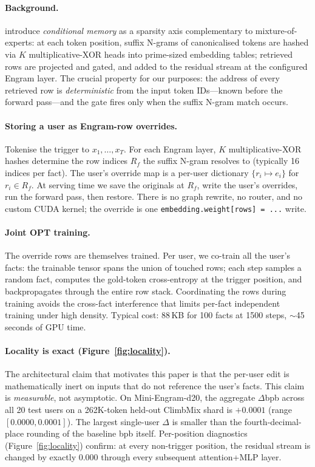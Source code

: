 \documentclass{article}
\begin{document}
\paragraph{Background.} \citet{cheng2026engram} introduce
\emph{conditional memory} as a sparsity axis complementary to
mixture-of-experts: at each token position, suffix N-grams of canonicalised
tokens are hashed via $K$ multiplicative-XOR heads into prime-sized
embedding tables; retrieved rows are projected and gated, and added to
the residual stream at the configured Engram layer. The crucial
property for our purposes: the address of every retrieved row is
\emph{deterministic} from the input token IDs—known before the
forward pass—and the gate fires only when the suffix N-gram match
occurs.

\paragraph{Storing a user as Engram-row overrides.} Tokenise the
trigger to $x_1, \dots, x_T$. For each Engram layer, $K$
multiplicative-XOR hashes determine the row indices $R_f$ the suffix
N-gram resolves to (typically 16 indices per fact). The user's
override map is a per-user dictionary $\{r_i \mapsto e_i\}$ for
$r_i \in R_f$. At serving time we save the originals at $R_f$, write
the user's overrides, run the forward pass, then restore. There is no
graph rewrite, no router, and no custom CUDA kernel; the override is
one \texttt{embedding.weight[rows] = ...} write.

\paragraph{Joint OPT training.}
The override rows are themselves trained. Per user, we co-train all
the user's facts: the trainable tensor spans the union of touched
rows; each step samples a random fact, computes the gold-token
cross-entropy at the trigger position, and backpropagates through the
entire row stack. Coordinating the rows during training avoids the
cross-fact interference that limits per-fact independent training
under high density. Typical cost: 88\,KB for 100 facts at 1500 steps,
$\sim$45 seconds of GPU time.

\paragraph{Locality is exact (Figure~\ref{fig:locality}).}
The architectural claim that motivates this paper is that the per-user
edit is mathematically inert on inputs that do not reference the
user's facts. This claim is \emph{measurable}, not asymptotic. On
Mini-Engram-d20, the aggregate $\Delta$bpb across all 20 test users
on a 262K-token held-out ClimbMix shard is $+0.0001$ (range
$[0.0000, 0.0001]$). The largest single-user $\Delta$ is smaller than
the fourth-decimal-place rounding of the baseline bpb itself.
Per-position diagnostics (Figure~\ref{fig:locality}) confirm: at every
non-trigger position, the residual stream is changed by exactly
$0.000$ through every subsequent attention+MLP layer.
\end{document}
